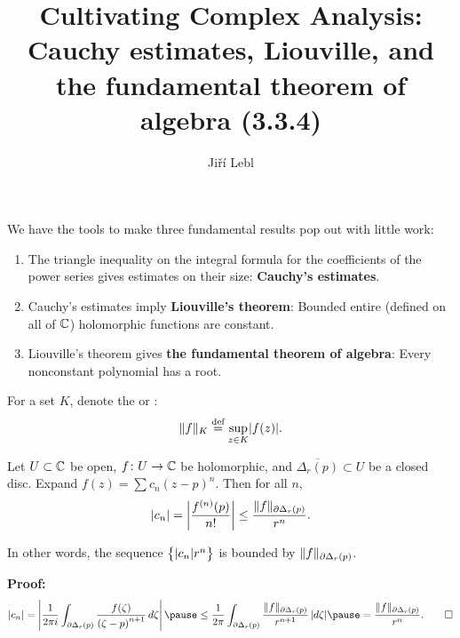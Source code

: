 \documentclass[10pt,aspectratio=169]{beamer}
\author{Ji\v{r}\'i Lebl}
\institute[OSU]{%
Departemento pri Matematiko de Oklahoma {\^S}tata Universitato}
\title{Cultivating Complex Analysis:\\%
Cauchy estimates, Liouville, and\\%
the fundamental theorem of algebra (3.3.4)}
\date{}
\begin{document}
\begin{frame}
\titlepage
\end{frame}

\begin{frame}
We have the tools to make three fundamental results pop out with little
work:

\begin{enumerate}
\pause
\item
The triangle inequality on the integral formula
for the coefficients of the power series
gives estimates on their size: \textbf{Cauchy's estimates}.

\pause
\item
Cauchy's estimates imply \textbf{Liouville's theorem}: Bounded entire (defined on all
of ${\mathbb{C}}$) holomorphic functions are constant.

\pause
\item
Liouville's theorem gives \textbf{the fundamental theorem of algebra}:
Every nonconstant polynomial has a root.
\end{enumerate}

\end{frame}

\begin{frame}
For a set $K$, denote the \emph{} or
\emph{}:
\begin{equation*}
\lVert {f} \rVert_K
\overset{\text{def}}{=}
\sup_{z \in K} \lvert {f(z)} \rvert .
\end{equation*}

\pause

\begin{theorem}
Let $U \subset {\mathbb{C}}$ be open, $f \colon U \to {\mathbb{C}}$ be
holomorphic, and $\overline{\Delta_r(p)} \subset U$
be a closed disc.  Expand $f(z) = \sum c_n {(z-p)}^n$.
Then for all $n$,
\[
\lvert {c_n} \rvert =
\left\lvert {\frac{f^{(n)}(p)}{n!}} \right\rvert
\leq
\frac{\lVert {f} \rVert_{\partial \Delta_r(p)}}{r^{n}} .
\]
\end{theorem}

\pause

In other words, the sequence $\bigl\{ \lvert {c_n} \rvert r^n \bigr\}$ is bounded by
$\lVert {f} \rVert_{\partial \Delta_r(p)}$.

\medskip
\pause

\textbf{Proof:}
\[
\sabs{c_n}  = 
\abs{
\frac{1}{2\pi i}
\int_{\partial \Delta_r(p)}
\frac{f(\zeta)}{{(\zeta-p)}^{n+1}}
\,
d \zeta 
}
\pause
\leq
\frac{1}{2\pi}
\int_{\partial \Delta_r(p)}
\frac{\snorm{f}_{\partial \Delta_r(p)}}{r^{n+1}}
\,
\sabs{d \zeta} 
\pause
=
\frac{\snorm{f}_{\partial \Delta_r(p)}}{r^{n}} .
\qed
\]

\end{frame}
\end{document}
